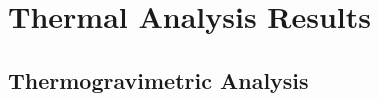 \clearpage
%
%



%
%

\section{Thermal Analysis Results}
\label{sup:Thermal-Results}

\subsection{Thermogravimetric Analysis}
\label{sup:Thermal-Results-TGA}

